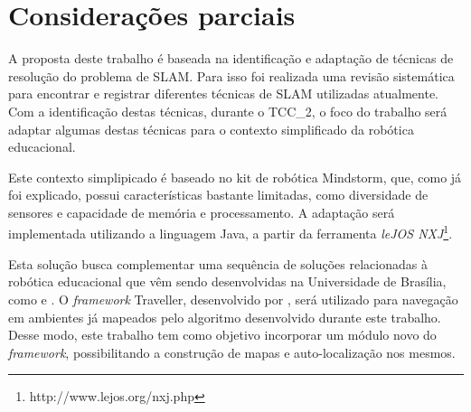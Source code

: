 
\section{Considerações parciais} %
\label{sec:considerações_parciais}

A proposta deste trabalho é baseada na identificação e adaptação de técnicas de resolução do problema de SLAM. Para isso foi realizada uma revisão sistemática para encontrar e registrar diferentes técnicas de SLAM utilizadas atualmente. Com a identificação destas técnicas, durante o TCC\_2, o foco do trabalho será adaptar algumas destas técnicas para o contexto simplificado da robótica educacional.

Este contexto simplipicado é baseado no kit de robótica Mindstorm, que, como já foi explicado, possui características bastante limitadas, como diversidade de sensores e capacidade de memória e processamento. A adaptação será implementada utilizando a linguagem Java, a partir da ferramenta \textit{leJOS NXJ}\footnote{http://www.lejos.org/nxj.php}.

Esta solução busca complementar uma sequência de soluções relacionadas à robótica educacional que vêm sendo desenvolvidas na Universidade de Brasília, como \cite{tccCarol} e \cite{tccRodrigo}. O \textit{framework} Traveller, desenvolvido por \cite{tccRodrigo}, será utilizado para navegação em ambientes já mapeados pelo algoritmo desenvolvido durante este trabalho. Desse modo, este trabalho tem como objetivo incorporar um módulo novo do \textit{framework}, possibilitando a construção de mapas e auto-localização nos mesmos.


